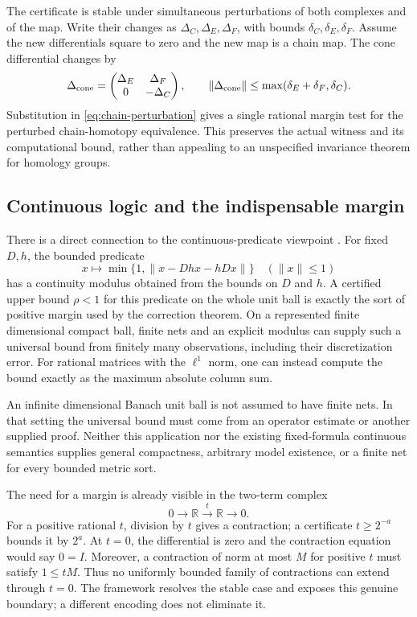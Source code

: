 The certificate is stable under simultaneous perturbations of both
complexes and of the map.  Write their changes as
$\Delta_C,\Delta_E,\Delta_F$, with bounds
$\delta_C,\delta_E,\delta_F$.  Assume the new differentials square to
zero and the new map is a chain map.  The cone differential changes by
\[
 \Delta_{\rm cone}=
   \begin{pmatrix}\Delta_E&\Delta_F\\0&-\Delta_C\end{pmatrix},
 \qquad
 \|\Delta_{\rm cone}\|
       \le\max(\delta_E+\delta_F,\delta_C).
\]
Substitution in \eqref{eq:chain-perturbation} gives a single rational
margin test for the perturbed chain-homotopy equivalence.  This preserves
the actual witness and its computational bound, rather than appealing to
an unspecified invariance theorem for homology groups.

\subsection{Continuous logic and the indispensable margin}

There is a direct connection to the continuous-predicate viewpoint
\cite{bbhu2008}.  For fixed $D,h$, the bounded predicate
\[
 x\longmapsto\min\{1,\|x-Dhx-hDx\|\}
                     \quad (\|x\|\le1)
\]
has a continuity modulus obtained from the bounds on $D$ and $h$.
A certified upper bound $\rho<1$ for this predicate on the whole unit
ball is exactly the sort of positive margin used by the correction
theorem.  On a represented finite dimensional compact ball, finite nets
and an explicit modulus can supply such a universal bound from finitely
many observations, including their discretization error.  For rational
matrices with the $\ell^1$ norm, one can instead compute the bound
exactly as the maximum absolute column sum.

An infinite dimensional Banach unit ball is not assumed to have finite
nets.  In that setting the universal bound must come from an operator
estimate or another supplied proof.  Neither this application nor the
existing fixed-formula continuous semantics supplies general compactness,
arbitrary model existence, or a finite net for every bounded metric sort.

The need for a margin is already visible in the two-term complex
\[
             0\longrightarrow\mathbb R
                   \xrightarrow{\;t\;}\mathbb R
                       \longrightarrow0.
\]
For a positive rational $t$, division by $t$ gives a contraction; a
certificate $t\ge2^{-a}$ bounds it by $2^a$.  At $t=0$, the
differential is zero and the contraction equation would say $0=I$.
Moreover, a contraction of norm at most $M$ for positive $t$ must satisfy
$1\le tM$.  Thus no uniformly bounded family of contractions can
extend through $t=0$.  The framework resolves the stable case and
exposes this genuine boundary; a different encoding does not eliminate it.


